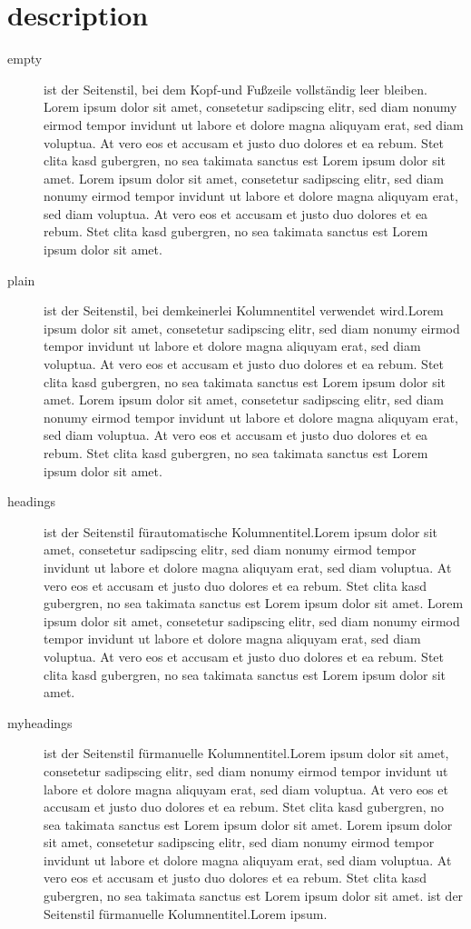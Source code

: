 \section{description}
\begin{description}
	\item[empty] ist der Seitenstil, bei dem Kopf-und Fußzeile vollständig leer bleiben. Lorem ipsum
	dolor sit amet, consetetur sadipscing elitr, sed diam nonumy eirmod tempor invidunt ut labore et dolore magna aliquyam erat, sed diam voluptua. At vero eos et accusam et justo duo dolores et ea rebum. Stet clita kasd gubergren, no sea takimata sanctus est Lorem ipsum dolor sit amet. Lorem ipsum dolor sit amet, consetetur sadipscing elitr, sed diam nonumy eirmod tempor invidunt ut labore et dolore magna aliquyam erat, sed diam voluptua. At vero eos et accusam et justo duo dolores et ea rebum. Stet clita kasd gubergren, no sea takimata sanctus est Lorem ipsum dolor sit amet.
	
	\item[plain] ist der Seitenstil, bei demkeinerlei Kolumnentitel verwendet wird.Lorem ipsum
	dolor sit amet, consetetur sadipscing elitr, sed diam nonumy eirmod tempor invidunt ut labore et dolore magna aliquyam erat, sed diam voluptua. At vero eos et accusam et justo duo dolores et ea rebum. Stet clita kasd gubergren, no sea takimata sanctus est Lorem ipsum dolor sit amet. Lorem ipsum dolor sit amet, consetetur sadipscing elitr, sed diam nonumy eirmod tempor invidunt ut labore et dolore magna aliquyam erat, sed diam voluptua. At vero eos et accusam et justo duo dolores et ea rebum. Stet clita kasd gubergren, no sea takimata sanctus est Lorem ipsum dolor sit amet.
	
	\item[headings] ist der Seitenstil fürautomatische Kolumnentitel.Lorem ipsum
	dolor sit amet, consetetur sadipscing elitr, sed diam nonumy eirmod tempor invidunt ut labore et dolore magna aliquyam erat, sed diam voluptua. At vero eos et accusam et justo duo dolores et ea rebum. Stet clita kasd gubergren, no sea takimata sanctus est Lorem ipsum dolor sit amet. Lorem ipsum dolor sit amet, consetetur sadipscing elitr, sed diam nonumy eirmod tempor invidunt ut labore et dolore magna aliquyam erat, sed diam voluptua. At vero eos et accusam et justo duo dolores et ea rebum. Stet clita kasd gubergren, no sea takimata sanctus est Lorem ipsum dolor sit amet.
	
	\item[myheadings] ist der Seitenstil fürmanuelle Kolumnentitel.Lorem ipsum 
	dolor sit amet, consetetur sadipscing elitr, sed diam nonumy eirmod tempor invidunt ut labore et dolore magna aliquyam erat, sed diam voluptua. At vero eos et accusam et justo duo dolores et ea rebum. Stet clita kasd gubergren, no sea takimata sanctus est Lorem ipsum dolor sit amet. Lorem ipsum dolor sit amet, consetetur sadipscing elitr, sed diam nonumy eirmod tempor invidunt ut labore et dolore magna aliquyam erat, sed diam voluptua. At vero eos et accusam et justo duo dolores et ea rebum. Stet clita kasd gubergren, no sea takimata sanctus est Lorem ipsum dolor sit amet. ist der Seitenstil fürmanuelle Kolumnentitel.Lorem ipsum.
\end{description}

